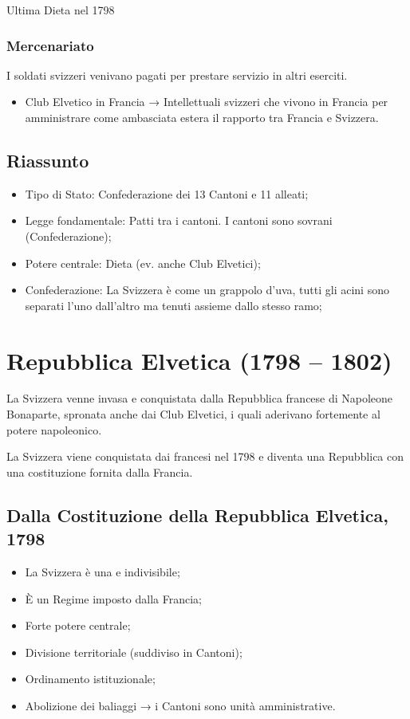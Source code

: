 \documentclass{article}
\begin{document}
Ultima Dieta nel 1798

\subsubsection{Mercenariato}
I soldati svizzeri venivano pagati per prestare servizio in altri eserciti.
\begin{itemize}
    \item Club Elvetico in Francia → Intellettuali svizzeri che vivono in Francia per
        amministrare come ambasciata estera il rapporto tra Francia e Svizzera.
\end{itemize}

\subsection{Riassunto}
\begin{itemize}
    \item Tipo di Stato: Confederazione dei 13 Cantoni e 11 alleati;
    \item Legge fondamentale: Patti tra i cantoni. I cantoni sono sovrani (Confederazione);
    \item Potere centrale: Dieta (ev. anche Club Elvetici);
    \item Confederazione: La Svizzera è come un grappolo d’uva, tutti gli acini sono separati
        l’uno dall’altro ma tenuti assieme dallo stesso ramo;
\end{itemize}

\newpage
\section{Repubblica Elvetica (1798 – 1802)}
La Svizzera venne invasa e conquistata dalla Repubblica francese di Napoleone Bonaparte,
spronata anche dai Club Elvetici, i quali aderivano fortemente al potere napoleonico.

La Svizzera viene conquistata dai francesi nel 1798 e diventa una Repubblica con una
costituzione fornita dalla Francia.

\subsection{Dalla Costituzione della Repubblica Elvetica, 1798}
\begin{itemize}
    \item La Svizzera è una e indivisibile;
    \item È un Regime imposto dalla Francia;
    \item Forte potere centrale;
    \item Divisione territoriale (suddiviso in Cantoni);
    \item Ordinamento istituzionale;
    \item Abolizione dei baliaggi → i Cantoni sono unità amministrative.
\end{itemize}
\end{document}

